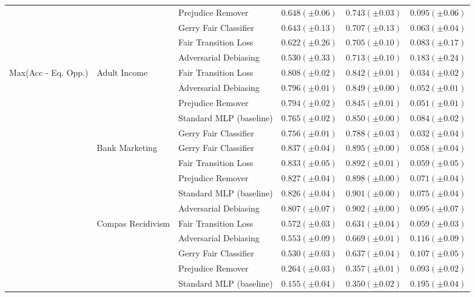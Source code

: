\begin{tabular}{llllll}
 &  & Prejudice Remover & $0.648 (\pm0.06)$ & $0.743 (\pm0.03)$ & $0.095 (\pm0.06)$ \\
 &  & Gerry Fair Classifier & $0.643 (\pm0.13)$ & $0.707 (\pm0.13)$ & $0.063 (\pm0.04)$ \\
 &  & Fair Transition Loss & $0.622 (\pm0.26)$ & $0.705 (\pm0.10)$ & $0.083 (\pm0.17)$ \\
 &  & Adversarial Debiasing & $0.530 (\pm0.33)$ & $0.713 (\pm0.10)$ & $0.183 (\pm0.24)$ \\
\cline{1-6} \cline{2-6}
\multirow[t]{20}{*}{Max(Acc - Eq. Opp.)} & \multirow[t]{5}{*}{Adult Income} & Fair Transition Loss & $0.808 (\pm0.02)$ & $0.842 (\pm0.01)$ & $0.034 (\pm0.02)$ \\
 &  & Adversarial Debiasing & $0.796 (\pm0.01)$ & $0.849 (\pm0.00)$ & $0.052 (\pm0.01)$ \\
 &  & Prejudice Remover & $0.794 (\pm0.02)$ & $0.845 (\pm0.01)$ & $0.051 (\pm0.01)$ \\
 &  & Standard MLP (baseline) & $0.765 (\pm0.02)$ & $0.850 (\pm0.00)$ & $0.084 (\pm0.02)$ \\
 &  & Gerry Fair Classifier & $0.756 (\pm0.01)$ & $0.788 (\pm0.03)$ & $0.032 (\pm0.04)$ \\
\cline{2-6}
 & \multirow[t]{5}{*}{Bank Marketing} & Gerry Fair Classifier & $0.837 (\pm0.04)$ & $0.895 (\pm0.00)$ & $0.058 (\pm0.04)$ \\
 &  & Fair Transition Loss & $0.833 (\pm0.05)$ & $0.892 (\pm0.01)$ & $0.059 (\pm0.05)$ \\
 &  & Prejudice Remover & $0.827 (\pm0.04)$ & $0.898 (\pm0.00)$ & $0.071 (\pm0.04)$ \\
 &  & Standard MLP (baseline) & $0.826 (\pm0.04)$ & $0.901 (\pm0.00)$ & $0.075 (\pm0.04)$ \\
 &  & Adversarial Debiasing & $0.807 (\pm0.07)$ & $0.902 (\pm0.00)$ & $0.095 (\pm0.07)$ \\
\cline{2-6}
 & \multirow[t]{5}{*}{Compas Recidivism} & Fair Transition Loss & $0.572 (\pm0.03)$ & $0.631 (\pm0.04)$ & $0.059 (\pm0.03)$ \\
 &  & Adversarial Debiasing & $0.553 (\pm0.09)$ & $0.669 (\pm0.01)$ & $0.116 (\pm0.09)$ \\
 &  & Gerry Fair Classifier & $0.530 (\pm0.03)$ & $0.637 (\pm0.04)$ & $0.107 (\pm0.05)$ \\
 &  & Prejudice Remover & $0.264 (\pm0.03)$ & $0.357 (\pm0.01)$ & $0.093 (\pm0.02)$ \\
 &  & Standard MLP (baseline) & $0.155 (\pm0.04)$ & $0.350 (\pm0.02)$ & $0.195 (\pm0.04)$ \\

\end{tabular}
